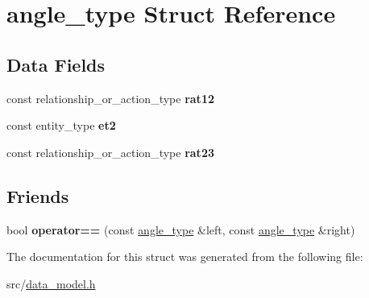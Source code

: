 \hypertarget{structangle__type}{}\section{angle\+\_\+type Struct Reference}
\label{structangle__type}
\subsection*{Data Fields}
\begin{DoxyCompactItemize}
\item 
\mbox{\label{structangle__type_a748f65a3ae97f3dba1cac69d40330f42}} 
const relationship\+\_\+or\+\_\+action\+\_\+type {\bfseries rat12}
\item 
\mbox{\label{structangle__type_a597582b9649e36a41e8f0a5e0ea50c66}} 
const entity\+\_\+type {\bfseries et2}
\item 
\mbox{\label{structangle__type_ad98ed08839b6c50759ae01fb72338cb9}} 
const relationship\+\_\+or\+\_\+action\+\_\+type {\bfseries rat23}
\end{DoxyCompactItemize}
\subsection*{Friends}
\begin{DoxyCompactItemize}
\item 
\mbox{\label{structangle__type_a259cbf4e32421b1e65066025fa86e999}} 
bool {\bfseries operator==} (const \hyperlink{structangle__type}{angle\+\_\+type} \&left, const \hyperlink{structangle__type}{angle\+\_\+type} \&right)
\end{DoxyCompactItemize}


The documentation for this struct was generated from the following file\+:\begin{DoxyCompactItemize}
\item 
src/\hyperlink{data__model_8h}{data\+\_\+model.\+h}\end{DoxyCompactItemize}

